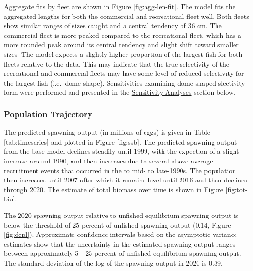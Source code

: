\documentclass[11pt,
  english,
  a4paper,
]{article}
\begin{document}

Aggregate fits by fleet are shown in Figure \ref{fig:agg-len-fit}. The model fits the aggregated lengths for both the commercial and recreational fleet well. Both fleets show similar ranges of sizes caught and a central tendency of 36 cm. The commercial fleet is more peaked compared to the recreational fleet, which has a more rounded peak around its central tendency and slight shift toward smaller sizes. The model expects a slightly higher proportion of the largest fish for both fleets relative to the data. This may indicate that the true selectivity of the recreational and commercial fleets may have some level of reduced selectivity for the largest fish (i.e.~dome-shape). Sensitivities examining dome-shaped slectivity form were performed and presented in the {\protect\hyperlink{sensitivity-analyses}{Sensitivity Analyses}\leavevmode\tagmcend\tagstructend} section below.

\leavevmode\tagmcend\tagstructend\par


\hypertarget{population-trajectory}{%
\subsubsection{Population Trajectory}\label{population-trajectory}}

\leavevmode\tagmcend\tagstructend


The predicted spawning output (in millions of eggs) is given in Table \ref{tab:timeseries} and plotted in Figure \ref{fig:ssb}. The predicted spawning output from the base model declines steadily until 1999, with the expection of a slight increase around 1990, and then increases due to several above average recruitment events that occurred in the to mid- to late-1990s. The population then increases until 2007 after which it remains level until 2016 and then declines through 2020. The estimate of total biomass over time is shown in Figure \ref{fig:tot-bio}.

\leavevmode\tagmcend\tagstructend\par


The 2020 spawning output relative to unfished equilibrium spawning output is below the threshold of 25 percent of unfished spawning output (0.14, Figure \ref{fig:depl}). Approximate confidence intervals based on the asymptotic variance estimates show that the uncertainty in the estimated spawning output ranges between approximately 5 - 25 percent of unfished equilibrium spawning output. The standard deviation of the log of the spawning output in 2020 is 0.39.
\end{document}
